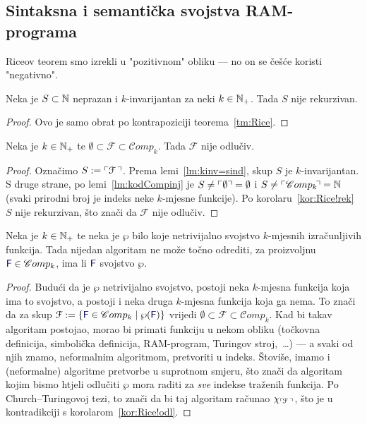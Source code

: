 \subsection{Sintaksna i semantička svojstva RAM-programa}

Riceov teorem smo izrekli u "pozitivnom" obliku --- no on se češće koristi "negativno".

\begin{korolar}[{name=[nerekurzivnost netrivijalnog $k$-invarijantnog skupa brojeva]}]\label{kor:Rice!rek}
Neka je $S\subset{\mathbb N}$ neprazan i $k$-invarijantan za neki $k\in{\mathbb N}_+$. Tada $S$ nije rekurzivan.
\end{korolar}
\begin{proof}
Ovo je samo obrat po kontrapoziciji teorema~\ref{tm:Rice}.
\end{proof}

\begin{korolar}[{name=[neodlučivost netrivijalnog skupa izračunljivih funkcija]}]\label{kor:Rice!odl}
Neka je $k\in{\mathbb N}_+$ te $\emptyset\subset\mathcal F\subset\mathscr Comp_k$. Tada $\mathcal F$ nije odlučiv\!.
\end{korolar}
\begin{proof}
	Označimo $S:=\ulcorner\mathcal F\,\urcorner$. Prema lemi~\ref{lm:kinv=sind}, skup $S$ je $k$-invarijantan. S druge strane, po lemi~\ref{lm:kodCompinj} je $S\ne\ulcorner\emptyset\urcorner=\emptyset$ i $S\ne\ulcorner\mathscr Comp_k\!\urcorner={\mathbb N}$ (svaki prirodni broj je indeks neke $k$-mjesne funkcije). Po korolaru~\ref{kor:Rice!rek} $S$ nije rekurzivan, što znači da $\mathcal F$ nije odlučiv\!.
\end{proof}

\begin{korolar}[{name=[neodlučivost netrivijalnih semantičkih svojstava]}]
Neka je $k\in{\mathbb N}_+$ te neka je $\wp$ bilo koje netrivijalno svojstvo $k$-mjesnih izračunljivih funkcija. Tada nijedan algoritam ne može točno odrediti, za proizvoljnu $\f F\in\mathscr Comp_k$, ima li $\f F$ svojstvo $\wp$.
\end{korolar}
\begin{proof}
Budući da je $\wp$ netrivijalno svojstvo, postoji neka $k$-mjesna funkcija koja ima to svojstvo, a postoji i neka druga $k$-mjesna funkcija koja ga nema. To znači da za skup $\mathcal F:=\{\f F\in\mathscr Comp_k\mid\wp(\f F)\}$ vrijedi $\emptyset\subset\mathcal F\subset\mathscr Comp_k$. Kad bi takav algoritam postojao, morao bi primati funkciju u nekom obliku (točkovna definicija, simbolička definicija, RAM-program, Turingov stroj,~\ldots) --- a svaki od njih znamo, neformalnim algoritmom, pretvoriti u indeks. Štoviše, imamo i (neformalne) algoritme pretvorbe u suprotnom smjeru, što znači da algoritam kojim bismo htjeli odlučiti $\wp$ mora raditi za \emph{sve} indekse traženih funkcija.
Po Church--\!Turingovoj tezi, to znači da bi taj algoritam računao $\chi_{\ulcorner\!\mathcal F\,\urcorner}$, što je u kontradikciji s korolarom~\ref{kor:Rice!odl}.
\end{proof}


